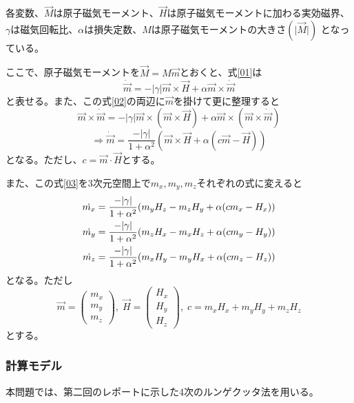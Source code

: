\documentclass{jsarticle}
\begin{document}
各変数、$\vec{M}$は原子磁気モーメント、$\vec{H}$は原子磁気モーメントに加わる実効磁界、
$\gamma$は磁気回転比、$\alpha$は損失定数、$M$は原子磁気モーメントの大きさ$(\lvert\vec{M}\rvert)$
となっている。

ここで、原子磁気モーメントを$\vec{M}=M\vec{m}$とおくと、式\ref{01}は
\begin{equation}
	\label{02}
	\dot{\vec{m}} = -\lvert\gamma\rvert\vec{m}\times\vec{H} + \alpha\vec{m}\times\dot{\vec{m}}
\end{equation}
と表せる。また、この式\ref{02}の両辺に$\vec{m}$を掛けて更に整理すると
\begin{equation}
	\vec{m}\times\dot{\vec{m}} = -\lvert\gamma\rvert\vec{m}\times(\vec{m}\times\vec{H}) + \alpha\vec{m}\times(\vec{m}\times\dot{\vec{m}})
\end{equation}
\begin{equation}
	\label{03}
	\Rightarrow\dot{\vec{m}} = \frac{-\lvert\gamma\rvert}{1+\alpha^2}(\vec{m}\times\vec{H} + \alpha(c\vec{m}-\vec{H}))
\end{equation}
となる。ただし、$c=\vec{m}\cdot\vec{H}$とする。

また、この式\ref{03}を3次元空間上で$m_x ,m_y ,m_z$それぞれの式に変えると
\begin{align}
	\dot{m_x} &= \frac{-\lvert\gamma\rvert}{1+\alpha^2}(m_y H_z - m_z H_y + \alpha(cm_x - H_x)) \notag \\
	\dot{m_y} &= \frac{-\lvert\gamma\rvert}{1+\alpha^2}(m_z H_x - m_x H_z + \alpha(cm_y - H_y)) \notag \\
	\dot{m_z} &= \frac{-\lvert\gamma\rvert}{1+\alpha^2}(m_x H_y - m_y H_x + \alpha(cm_z - H_z)) \notag
\end{align}
となる。ただし
\begin{equation}
	\vec{m} = \begin{pmatrix}
				m_x\\ m_y\\ m_z
			  \end{pmatrix}
	,\; \vec{H} = \begin{pmatrix}
					H_x\\ H_y\\ H_z
				\end{pmatrix}
	,\; c = m_xH_x + m_yH_y + m_zH_z
\end{equation}
とする。

\subsubsection{計算モデル}
本問題では、第二回のレポートに示した4次のルンゲクッタ法を用いる。
\end{document}
